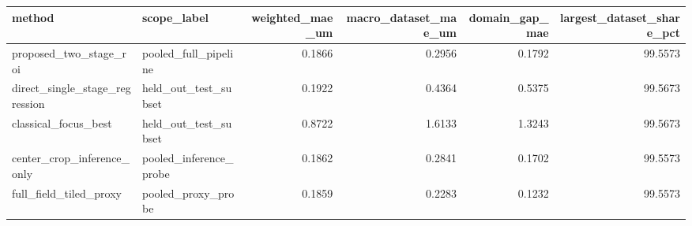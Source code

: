 \begin{tabular}{llrrrr}
\toprule
method & scope_label & weighted_mae_um & macro_dataset_mae_um & domain_gap_mae & largest_dataset_share_pct \\
\midrule
proposed_two_stage_roi & pooled_full_pipeline & 0.1866 & 0.2956 & 0.1792 & 99.5573 \\
direct_single_stage_regression & held_out_test_subset & 0.1922 & 0.4364 & 0.5375 & 99.5673 \\
classical_focus_best & held_out_test_subset & 0.8722 & 1.6133 & 1.3243 & 99.5673 \\
center_crop_inference_only & pooled_inference_probe & 0.1862 & 0.2841 & 0.1702 & 99.5573 \\
full_field_tiled_proxy & pooled_proxy_probe & 0.1859 & 0.2283 & 0.1232 & 99.5573 \\
\bottomrule
\end{tabular}
